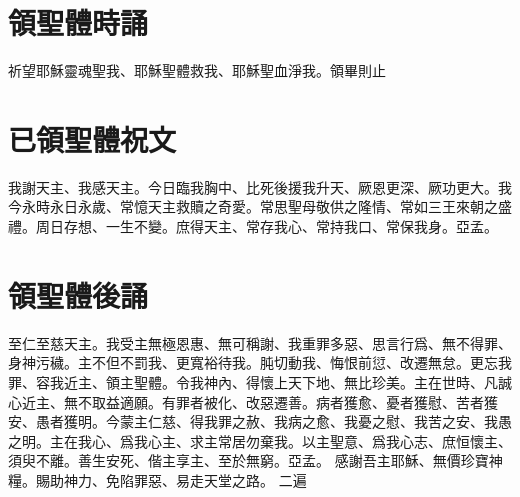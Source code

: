 \section*{領聖體時誦}
祈望耶穌靈魂聖我、耶穌聖體救我、耶穌聖血淨我。{\small 領畢則止}
\section*{已領聖體祝文}
我謝天主、我感天主。今日臨我胸中、比死後援我升天、厥恩更深、厥功更大。我今永時永日永歲、常憶天主救贖之奇愛。常思聖母敬供之隆情、常如三王來朝之盛禮。周日存想、一生不變。庶得天主、常存我心、常持我口、常保我身。{\cspace}亞孟。
\section*{領聖體後誦}
至仁至慈天主。我受主無極恩惠、無可稱謝、我重罪多惡、思言行爲、無不得罪、身神污穢。主不但不罰我、更寬裕待我。肫切動我、悔恨前愆、改遷無怠。更忘我罪、容我近主、領主聖體。令我神內、得懷上天下地、無比珍美。主在世時、凡誠心近主、無不取益適願。有罪者被化、改惡遷善。病者獲愈、憂者獲慰、苦者獲安、愚者獲明。今蒙主仁慈、得我罪之赦、我病之愈、我憂之慰、我苦之安、我愚之明。主在我心、爲我心主、求主常居勿棄我。以主聖意、爲我心志、庶恒懷主、須臾不離。善生安死、偕主享主、至於無窮。{\cspace}亞孟。
感謝吾主耶穌、無價珍寶神糧。賜助神力、免陷罪惡、易走天堂之路。 {\small 二遍}

